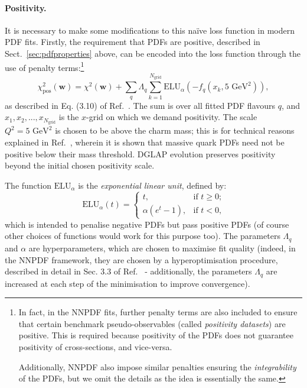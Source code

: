 \documentclass[withindex,glossary]{cam-thesis}
\renewcommand{\vec}[1]{\textbf{#1}} %
\begin{document}
\paragraph{Positivity.} It is necessary to make some modifications to this na\"{i}ve loss function in modern PDF fits. Firstly, the requirement that PDFs are positive, described in Sect.~\ref{sec:pdfproperties} above, can be encoded into the loss function through the use of penalty terms:\footnote{In fact, in the NNPDF fits, further penalty terms are also included to ensure that certain benchmark pseudo-observables (called \textit{positivity datasets}) are positive. This is required because positivity of the PDFs does not guarantee positivity of cross-sections, and vice-versa.

Additionally, NNPDF also impose similar penalties ensuring the \textit{integrability} of the PDFs, but we omit the details as the idea is essentially the same.}
\begin{equation}
\chi^2_{\text{pos}}(\vec{w}) = \chi^2(\vec{w}) + \sum_{q} \Lambda_q \sum_{k=1}^{N_{\text{grid}}} \textrm{ELU}_{\alpha}\left( - f_q(x_k, 5 \text{ GeV}^2) \right),  
\end{equation}
as described in Eq. (3.10) of Ref.~\cite{NNPDF:2021njg}. The sum is over all fitted PDF flavours $q$, and $x_1, x_2, ..., x_{N_{\text{grid}}}$ is the $x$-grid on which we demand positivity. The scale $Q^2 = 5 \text{ GeV}^2$ is chosen to be above the charm mass; this is for technical reasons explained in Ref.~\cite{Candido:2020yat}, wherein it is shown that massive quark PDFs need not be positive below their mass threshold. DGLAP evolution preserves positivity beyond the initial chosen positivity scale.

The function $\textrm{ELU}_{\alpha}$ is the \textit{exponential linear unit}, defined by:
\begin{equation}
\textrm{ELU}_{\alpha}(t) = \begin{cases} t, & \text{if $t \geq 0$;} \\ \alpha (e^t - 1), & \text{if $t < 0$,} \end{cases}
\end{equation}
which is intended to penalise negative PDFs but pass positive PDFs (of course other choices of functions would work for this purpose too). The parameters $\Lambda_q$ and $\alpha$ are hyperparameters, which are chosen to maximise fit quality (indeed, in the NNPDF framework, they are chosen by a hyperoptimisation procedure, described in detail in Sec. 3.3 of Ref.~\cite{NNPDF:2021njg} - additionally, the parameters $\Lambda_q$ are increased at each step of the minimisation to improve convergence).
\end{document}
